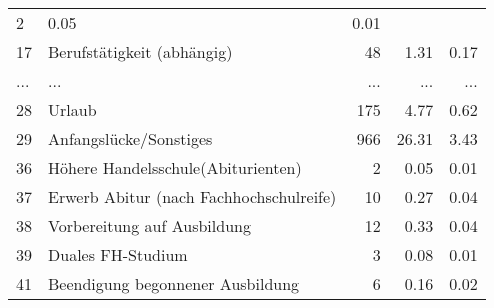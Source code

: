 \begin{longtable}{lXrrr}
          \num{2} &
          \num[round-mode=places,round-precision=2]{0.05} &
          \num[round-mode=places,round-precision=2]{0.01} \\
        17 & \multicolumn{1}{X}{Berufstätigkeit (abhängig)} & %
          \num{48} &
          \num[round-mode=places,round-precision=2]{1.31} &
          \num[round-mode=places,round-precision=2]{0.17} \\
       ... & ... & ... & ... & ... \\
        28 & \multicolumn{1}{X}{Urlaub} & %
          \num{175} &
          \num[round-mode=places,round-precision=2]{4.77} &
          \num[round-mode=places,round-precision=2]{0.62} \\

        29 & \multicolumn{1}{X}{Anfangslücke/Sonstiges} & %
          \num{966} &
          \num[round-mode=places,round-precision=2]{26.31} &
          \num[round-mode=places,round-precision=2]{3.43} \\

        36 & \multicolumn{1}{X}{Höhere Handelsschule(Abiturienten)} & %
          \num{2} &
          \num[round-mode=places,round-precision=2]{0.05} &
          \num[round-mode=places,round-precision=2]{0.01} \\

        37 & \multicolumn{1}{X}{Erwerb Abitur (nach Fachhochschulreife)} & %
          \num{10} &
          \num[round-mode=places,round-precision=2]{0.27} &
          \num[round-mode=places,round-precision=2]{0.04} \\

        38 & \multicolumn{1}{X}{Vorbereitung auf Ausbildung} & %
          \num{12} &
          \num[round-mode=places,round-precision=2]{0.33} &
          \num[round-mode=places,round-precision=2]{0.04} \\

        39 & \multicolumn{1}{X}{Duales FH-Studium} & %
          \num{3} &
          \num[round-mode=places,round-precision=2]{0.08} &
          \num[round-mode=places,round-precision=2]{0.01} \\

        41 & \multicolumn{1}{X}{Beendigung begonnener Ausbildung} & %
          \num{6} &
          \num[round-mode=places,round-precision=2]{0.16} &
          \num[round-mode=places,round-precision=2]{0.02} \\


\end{longtable}
